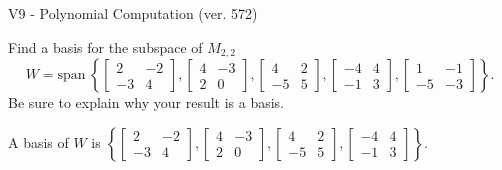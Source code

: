\begin{exercise}
  \begin{exerciseTitle}V9 - Polynomial Computation (ver. 572)\end{exerciseTitle}
  \begin{exerciseStatement}
    Find a basis for the subspace of \(M_{2,2}\) 
\[W=\mathrm{span}\ \left\{\left[\begin{array}{cc}
2 & -2 \\
-3 & 4
\end{array}\right] , \left[\begin{array}{cc}
4 & -3 \\
2 & 0
\end{array}\right] , \left[\begin{array}{cc}
4 & 2 \\
-5 & 5
\end{array}\right] , \left[\begin{array}{cc}
-4 & 4 \\
-1 & 3
\end{array}\right] , \left[\begin{array}{cc}
1 & -1 \\
-5 & -3
\end{array}\right]\right\}.\]
 Be sure to explain why your result is a basis.


  \end{exerciseStatement}
  \begin{exerciseAnswer}
   A basis of \(W\) is  \(\left\{\left[\begin{array}{cc}
2 & -2 \\
-3 & 4
\end{array}\right] , \left[\begin{array}{cc}
4 & -3 \\
2 & 0
\end{array}\right] , \left[\begin{array}{cc}
4 & 2 \\
-5 & 5
\end{array}\right] , \left[\begin{array}{cc}
-4 & 4 \\
-1 & 3
\end{array}\right]\right\}\).
  


  \end{exerciseAnswer}
\end{exercise}